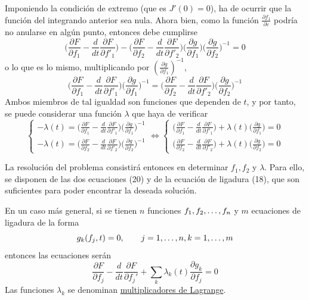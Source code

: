 \documentclass[12pt]{report}
\begin{document}
Imponiendo la condición de extremo (que es $J'(0) = 0$), ha de ocurrir que la función del integrando anterior sea nula. Ahora bien, como la función $\frac{\partial f_1}{\partial \varepsilon}$ podría no anularse en algún punto, entonces debe cumplirse
\[\biggl( \frac{\partial F}{\partial f_1}-\frac{d}{dt} \frac{\partial F}{\partial f'_1} \biggr) - \biggl( \frac{\partial F}{\partial f_2}-\frac{d}{dt} \frac{\partial F}{\partial f'_2} \biggr) \biggl(\frac{\partial g}{\partial f_1} \biggr) \biggl( \frac{\partial g}{\partial f_2} \biggr)^{-1} = 0\]
o lo que es lo mismo, multiplicando por $(\frac{\partial g}{\partial f_1})^{-1}$,
\[\biggl( \frac{\partial F}{\partial f_1}-\frac{d}{dt} \frac{\partial F}{\partial f'_1} \biggr)\biggl(\frac{\partial g}{\partial f_1} \biggr)^{-1} = \biggl( \frac{\partial F}{\partial f_2}-\frac{d}{dt} \frac{\partial F}{\partial f'_2} \biggr) \biggl( \frac{\partial g}{\partial f_2} \biggr)^{-1}\]
Ambos miembros de tal igualdad son funciones que dependen de $t$, y por tanto, se puede considerar una función $\lambda$ que haya de verificar
\[
\begin{cases}
\displaystyle -\lambda(t) = \biggl( \frac{\partial F}{\partial f_1}-\frac{d}{dt} \frac{\partial F}{\partial f'_1} \biggr)\biggl(\frac{\partial g}{\partial f_1} \biggr)^{-1} \\[0.5cm]
\displaystyle -\lambda(t) = \biggl( \frac{\partial F}{\partial f_2}-\frac{d}{dt} \frac{\partial F}{\partial f'_2} \biggr) \biggl( \frac{\partial g}{\partial f_2} \biggr)^{-1}
\end{cases} \!\!\!\! \iff \begin{cases}
\displaystyle \biggl( \frac{\partial F}{\partial f_1}-\frac{d}{dt} \frac{\partial F}{\partial f'_1} \biggr) +\lambda(t)\biggl(\frac{\partial g}{\partial f_1} \biggr) =0\\[0.5cm]
\displaystyle\biggl( \frac{\partial F}{\partial f_2}-\frac{d}{dt} \frac{\partial F}{\partial f'_2} \biggr) +\lambda(t)\biggl( \frac{\partial g}{\partial f_2} \biggr) =0
\end{cases} \tag{20}
\]

La resolución del problema consistirá entonces en determinar $f_1,f_2$ y $\lambda$. Para ello, se disponen de las dos ecuaciones (20) y de la ecuación de ligadura (18), que son suficientes para poder encontrar la deseada solución.

\vspace{2mm}
En un caso más general, si se tienen $n$ funciones $f_1,f_2,\mathellipsis,f_n$ y $m$ ecuaciones de ligadura de la forma
\[g_k(f_j,t)=0, \qquad j = 1,\mathellipsis,n, k = 1,\mathellipsis,m\]
entonces las ecuaciones serán
\[\boxed{\frac{\partial F}{\partial f_j}-\frac{d}{dt}\frac{\partial F}{\partial f_j'} + \sum_k \lambda_k(t)\frac{\partial g_k}{\partial f_j} = 0}\]
Las funciones $\lambda_k$ se denominan \ul{multiplicadores de Lagrange}.
\end{document}

